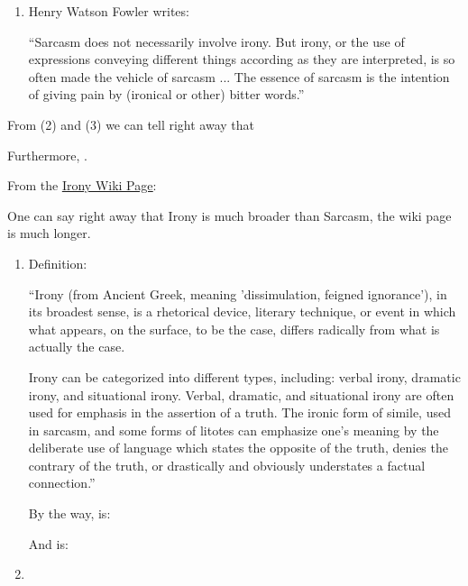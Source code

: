 \begin{enumerate}
    \item Henry Watson Fowler writes:
    \begin{center}
        ``Sarcasm does not necessarily involve irony. But irony, or the use of expressions conveying different things according as they are interpreted, is so often made the vehicle of sarcasm ... The essence of sarcasm is the intention of giving pain by (ironical or other) bitter words.''
    \end{center}
    
    
\end{enumerate}

From (2) and (3) we can tell right away that 

Furthermore, .


\vspace{1cm}

From the \href{https://en.wikipedia.org/wiki/Irony}{\ul{Irony Wiki Page}}:

One can say right away that Irony is much broader than Sarcasm, the wiki page is much longer.

\begin{enumerate}
    \item Definition:
    \begin{center}
        ``Irony (from Ancient Greek, meaning 'dissimulation, feigned ignorance'), in its broadest sense, is a rhetorical device, literary technique, or event in which what appears, on the surface, to be the case, differs radically from what is actually the case.

        Irony can be categorized into different types, including: verbal irony, dramatic irony, and situational irony. Verbal, dramatic, and situational irony are often used for emphasis in the assertion of a truth. The ironic form of simile, used in sarcasm, and some forms of litotes can emphasize one's meaning by the deliberate use of language which states the opposite of the truth, denies the contrary of the truth, or drastically and obviously understates a factual connection.''
    \end{center}


    By the way,  is:
        
    And  is:

    \item 
\end{enumerate}









